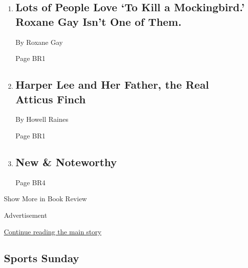 \begin{enumerate}
\def\labelenumi{\arabic{enumi}.}
\item
  \href{/2018/06/18/books/review/tom-santopietro-why-to-kill-a-mockingbird-matters.html}{}

  \hypertarget{lots-of-people-love-to-kill-a-mockingbird-roxane-gay-isnt-one-of-them}{%
  \subsection{Lots of People Love `To Kill a Mockingbird.' Roxane Gay
  Isn't One of
  Them.}\label{lots-of-people-love-to-kill-a-mockingbird-roxane-gay-isnt-one-of-them}}

  By Roxane Gay

  Page BR1
\item
  \href{/2018/06/18/books/review/atticus-finch-joseph-crespino-ac-lee-biography.html}{}

  \hypertarget{harper-lee-and-her-father-the-real-atticus-finch}{%
  \subsection{Harper Lee and Her Father, the Real Atticus
  Finch}\label{harper-lee-and-her-father-the-real-atticus-finch}}

  By Howell Raines

  Page BR1
\item
  \href{/2018/06/19/books/review/ginia-bellafante-new-noteworthy.html}{}

  \hypertarget{new--noteworthy}{%
  \subsection{New \& Noteworthy}\label{new--noteworthy}}

  Page BR4
\end{enumerate}

Show More in Book Review

Advertisement

\protect\hyperlink{after-mid6}{Continue reading the main story}

\hypertarget{sports-sunday}{%
\subsection{Sports Sunday}\label{sports-sunday}}

